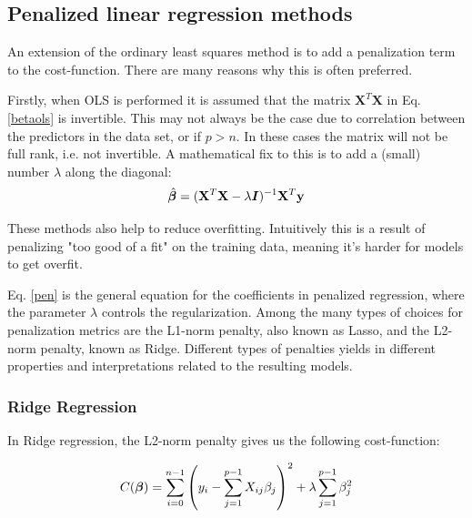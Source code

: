 
\subsection{Penalized linear regression methods}\label{pen-reg}

An extension of the ordinary least squares method is to add a penalization term to the cost-function. There are many reasons why this is often preferred. 

Firstly, when OLS is performed it is assumed that the matrix $\boldsymbol{X}^T\boldsymbol{X}$ in Eq. \ref{betaols} is invertible. This may not always be the case due to correlation between the predictors in the data set, or if $p > n$. In these cases the matrix will not be full rank, i.e. not invertible. 
A mathematical fix to this is to add a (small) number $\lambda$ along the diagonal: 
\begin{equation}\label{pen}
    \hat{\boldsymbol{\beta}} = (\mathbf{X}^T\mathbf{X}- \lambda\boldsymbol{I})^{-1}\mathbf{X}^T\mathbf{y}
\end{equation}

These methods also help to reduce overfitting. Intuitively this is a result of penalizing "too good of a fit" on the training data, meaning it's harder for models to get overfit. 

Eq. \ref{pen} is the general equation for the coefficients in penalized regression, where the parameter $\lambda$ controls the regularization. Among the many types of choices for penalization metrics are the L1-norm penalty, also known as Lasso, and the L2-norm penalty, known as Ridge. Different types of penalties yields in different properties and interpretations related to the resulting models.

\subsubsection{Ridge Regression}\label{ridge_sec}

In Ridge regression, the L2-norm penalty gives us the following cost-function:

\begin{equation}\label{ridge}
     C(\boldsymbol{\beta}) = \sum_{i=0}^{n-1} \left( y_i - \sum_{j=1}^{p-1} X_{ij}\beta_j \right)^2 + \lambda\sum_{j=1}^{p-1} \beta_j^2 
\end{equation}




